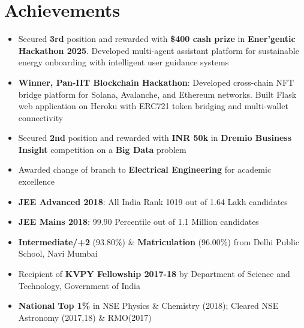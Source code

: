 \documentclass[a4paper,10pt]{article}
\begin{document}
\section{Achievements}
\begin{itemize}[itemsep = -0.75 mm, leftmargin=*]
\item Secured {\bf 3rd} position and rewarded with \textbf{\$400 cash prize} in {\bf Ener'gentic Hackathon 2025}. Developed multi-agent assistant platform for sustainable energy onboarding with intelligent user guidance systems
\item \textbf{Winner, Pan-IIT Blockchain Hackathon}: Developed cross-chain NFT bridge platform for Solana, Avalanche, and Ethereum networks. Built Flask web application on Heroku with ERC721 token bridging and multi-wallet connectivity
\item Secured {\bf 2nd} position and rewarded with \textbf{INR 50k} in {\bf Dremio Business Insight} competition on a \textbf{Big Data} problem
\item Awarded change of branch to {\bf Electrical Engineering} for academic excellence
\item {\bf JEE Advanced 2018}: All India Rank 1019 out of 1.64 Lakh candidates
\item {\bf JEE Mains 2018}: 99.90 Percentile out of 1.1 Million candidates
\item {\bf Intermediate/+2} (93.80\%) \& {\bf Matriculation} (96.00\%) from Delhi Public School, Navi Mumbai
\item Recipient of {\bf KVPY Fellowship 2017-18} by Department of Science and Technology, Government of India
\item {\bf National Top 1\%} in NSE Physics \& Chemistry (2018); Cleared NSE Astronomy (2017,18) \& RMO(2017)

\end{itemize}
\end{document}
